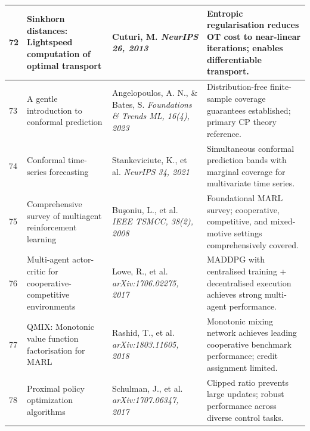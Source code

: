 \documentclass[12pt,a4paper,oneside]{report}
\theoremstyle{definition}
\theoremstyle{remark}
\begin{document}
\begin{center}
\begin{longtable}{|p{0.8cm}|p{4.2cm}|>{\raggedright\arraybackslash}p{4cm}|p{4.5cm}|}
72 & Sinkhorn distances: Lightspeed computation of optimal transport \cite{Cuturi2013Sinkhorn} & Cuturi, M. \newline\newline \textit{NeurIPS 26, 2013} & Entropic regularisation reduces OT cost to near-linear iterations; enables differentiable transport. \\ \hline

73 & A gentle introduction to conformal prediction \cite{Angelopoulos2023CP} & Angelopoulos, A. N., \& Bates, S. \newline\newline \textit{Foundations \& Trends ML, 16(4), 2023} & Distribution-free finite-sample coverage guarantees established; primary CP theory reference. \\ \hline

74 & Conformal time-series forecasting \cite{Stankeviciute2021CPTS} & Stankeviciute, K., et al. \newline\newline \textit{NeurIPS 34, 2021} & Simultaneous conformal prediction bands with marginal coverage for multivariate time series. \\ \hline

75 & Comprehensive survey of multiagent reinforcement learning \cite{Busoniu2008MARL} & Bu\c{s}oniu, L., et al. \newline\newline \textit{IEEE TSMCC, 38(2), 2008} & Foundational MARL survey; cooperative, competitive, and mixed-motive settings comprehensively covered. \\ \hline

76 & Multi-agent actor-critic for cooperative-competitive environments \cite{Lowe2017MADDPG} & Lowe, R., et al. \newline\newline \textit{arXiv:1706.02275, 2017} & MADDPG with centralised training + decentralised execution achieves strong multi-agent performance. \\ \hline

77 & QMIX: Monotonic value function factorisation for MARL \cite{Rashid2018QMIX} & Rashid, T., et al. \newline\newline \textit{arXiv:1803.11605, 2018} & Monotonic mixing network achieves leading cooperative benchmark performance; credit assignment limited. \\ \hline

78 & Proximal policy optimization algorithms \cite{Schulman2017PPO} & Schulman, J., et al. \newline\newline \textit{arXiv:1707.06347, 2017} & Clipped ratio prevents large updates; robust performance across diverse control tasks. \\ \hline


\end{longtable}
\end{center}
\end{document}
